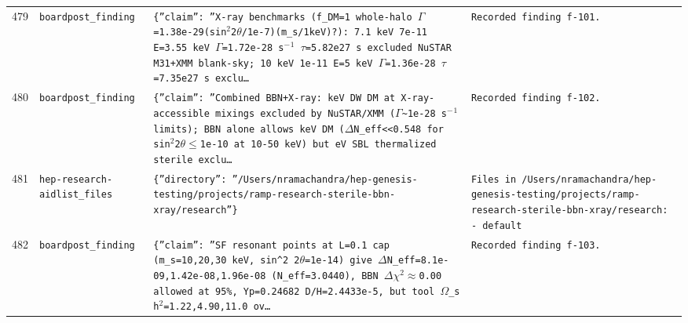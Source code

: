 \documentclass[11pt,a4paper]{article}
\begin{document}
\begin{longtable}{@{}p{}p{}p{}p{}@{}}
479 & \texttt{board}\newline\texttt{post\_\allowbreak{}finding} & \texttt{\{''claim'':\allowbreak{} ''X-ray benchmarks (f\_\allowbreak{}DM=\allowbreak{}1 whole-halo $\Gamma$=\allowbreak{}1.38e-29(sin$^2$2$\theta$/\allowbreak{}1e-7)\allowbreak{}(m\_\allowbreak{}s/\allowbreak{}1keV)\allowbreak{}?)\allowbreak{}:\allowbreak{} 7.1 keV 7e-11 E=\allowbreak{}3.55 keV $\Gamma$=\allowbreak{}1.72e-28 s$^-$$^1$ $\tau$=\allowbreak{}5.82e27 s excluded NuSTAR M31+XMM blank-sky;\allowbreak{} 10 keV 1e-11 E=\allowbreak{}5 keV $\Gamma$=\allowbreak{}1.36e-28 $\tau$=\allowbreak{}7.35e27 s exclu\ldots{}\allowbreak{}} & \texttt{Recorded finding f-101.} \\
480 & \texttt{board}\newline\texttt{post\_\allowbreak{}finding} & \texttt{\{''claim'':\allowbreak{} ''Combined BBN+X-ray:\allowbreak{} keV DW DM at X-ray-accessible mixings excluded by NuSTAR/\allowbreak{}XMM ($\Gamma$\textasciitilde{}\allowbreak{}1e-28 s$^-$$^1$ limits)\allowbreak{};\allowbreak{} BBN alone allows keV DM ($\Delta$N\_\allowbreak{}eff\textless{}\allowbreak{}\textless{}\allowbreak{}0.548 for sin$^2$2$\theta$$\leq$1e-10 at 10-50 keV)\allowbreak{} but eV SBL thermalized sterile exclu\ldots{}\allowbreak{}} & \texttt{Recorded finding f-102.} \\
481 & \texttt{hep-research-aid}\newline\texttt{list\_\allowbreak{}files} & \texttt{\{''directory'':\allowbreak{} ''/\allowbreak{}Users/\allowbreak{}nramachandra/\allowbreak{}hep-genesis-testing/\allowbreak{}projects/\allowbreak{}ramp-research-sterile-bbn-xray/\allowbreak{}research''\}\allowbreak{}} & \texttt{Files in /\allowbreak{}Users/\allowbreak{}nramachandra/\allowbreak{}hep-genesis-testing/\allowbreak{}projects/\allowbreak{}ramp-research-sterile-bbn-xray/\allowbreak{}research:\allowbreak{}   - default} \\
482 & \texttt{board}\newline\texttt{post\_\allowbreak{}finding} & \texttt{\{''claim'':\allowbreak{} ''SF resonant points at L=\allowbreak{}0.1 cap (m\_\allowbreak{}s=\allowbreak{}10,\allowbreak{}20,\allowbreak{}30 keV,\allowbreak{} sin\textasciicircum{}\allowbreak{}2 2$\theta$=\allowbreak{}1e-14)\allowbreak{} give $\Delta$N\_\allowbreak{}eff=\allowbreak{}8.1e-09,\allowbreak{}1.42e-08,\allowbreak{}1.96e-08 (N\_\allowbreak{}eff=\allowbreak{}3.0440)\allowbreak{},\allowbreak{} BBN $\Delta$$\chi$$^2$$\approx$0.00 allowed at 95\%,\allowbreak{} Yp=\allowbreak{}0.24682 D/\allowbreak{}H=\allowbreak{}2.4433e-5,\allowbreak{} but tool $\Omega$\_\allowbreak{}s h$^2$=\allowbreak{}1.22,\allowbreak{}4.90,\allowbreak{}11.0 ov\ldots{}\allowbreak{}} & \texttt{Recorded finding f-103.} \\

\end{longtable}
\end{document}
